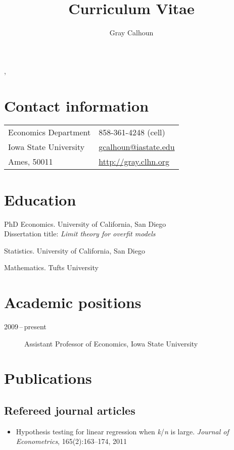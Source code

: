 \documentclass[11pt]{article}%
\author{Gray Calhoun}
\title{Curriculum Vitae}
\makeatletter
\newcommand{\allcaps}[1]{\textls{\MakeUppercase{#1}}}
\def\maketitle{%
\begin{center}%
\par{\textls{\MakeUppercase{\textbf{\@author}}}}%
\vspace{\itemsep}%
\par{\@title, \@date}%
\end{center}%
}
\makeatother
\begin{document}
\maketitle

\section*{Contact information}
\begin{tabular}{@{}ll@{}}
Economics Department     & 858-361-4248 (cell)    \\
Iowa State University    & \url{gcalhoun@iastate.edu} \\
Ames, \allcaps{IA} 50011 & \url{http://gray.clhn.org}
\end{tabular}

\section*{Education}

\begin{description}[noitemsep]
\item[2009] PhD Economics. University of California, San Diego \\
Dissertation title: \textit{Limit theory for overfit models}
\item[2006] \allcaps{MS} Statistics. University of California, San Diego
\item[2001] \allcaps{BA} Mathematics. Tufts University
\end{description}

\section*{Academic positions}

\begin{description}
\item[2009\,--\,present] Assistant Professor of Economics, Iowa State University
\end{description}

\section*{Publications}
\subsection*{Refereed journal articles}

\begin{itemize}
\item Hypothesis testing for linear regression when
\textit{k}/\textit{n} is large. \textit{Journal of Econometrics},
165(2):163--174, 2011
\end{itemize}
\end{document}
